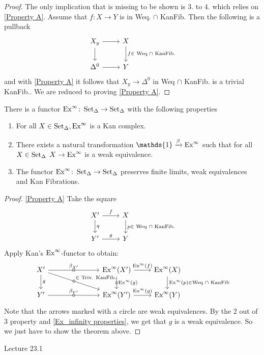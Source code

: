 \begin{proof}
    The only implication that is missing to be shown is 3. to 4. which relies on \cref{Property A}.
    Assume that $f\colon X \to Y$ is in Weq. $\cap$ KanFib.
    Then the following is a pullback
    \[
    \begin{tikzcd}
        X_y
        \rar
        \dar
        &
        X
        \ar[d, "f \in \text{ Weq $\cap$ KanFib.}"]
        \\
        \Delta^0 
        \rar
        &
        Y
    \end{tikzcd}
    \]
    and with \cref{Property A} it follows that $X_y \to \Delta^0$ in Weq $\cap$ KanFib. is a trivial KanFib..
    We are reduced to proving \cref{Property A}.
\end{proof}

\begin{thm}
    There is a functor $\text{Ex}^\infty \colon \operatorname{Set}_{\Delta} \to \operatorname{Set}_{\Delta}$ with the following properties 
    \begin{enumerate}
        \item 
        For all $X \in \operatorname{Set}_{\Delta}, \text{Ex}^\infty$ is a Kan complex.
        \item 
        There exists a natural transformation $\mathds{1} \xrightarrow{\beta} \Exinfty$ such that for all $X \in \operatorname{Set}_{\Delta}$ $X \to \text{Ex}^\infty$ is a weak equivalence.
        \item   
        The functor $\text{Ex}^\infty \colon \operatorname{Set}_{\Delta} \to \operatorname{Set}_{\Delta}$ preserves finite limits, weak equivalences and Kan Fibrations.
    \end{enumerate}
\end{thm}

\begin{proof}{\cref{Property A}}    
    Take the square 
    \[
    \begin{tikzcd}
        X' 
        \ar[r,"f"]
        \ar[d, "q"]
        &
        X
        \ar[d, "p \in \text{ Weq $\cap$ KanFib.}"]
        \\
        Y'
        \ar[r, "g"]
        &
        Y
    \end{tikzcd}
    \]
    Apply Kan's $\text{Ex}^\infty$-functor to obtain:
    \[
    \begin{tikzcd}
        X'
        \ar[d, "g"]
        \ar[rrr, "\circ" marking, "\beta_{X'}"]
        \ar[rrrd, "\circ" marking, "\in \text{ Triv. KanFib. }"]
        &&&
        \Exinfty(X')
        \ar[r,"\Exinfty(f)"]
        \ar[d, "\circ" marking, "\Exinfty(g)"]
        &
        \Exinfty(X) 
        \ar[d, "\Exinfty(p) \in \text{Weq $\cap$ KanFib}"]
        \\
        Y'
        \ar[rrr, "\circ" marking, "\beta_{Y'}"]
        &&&
        \Exinfty(Y')
        \ar[r, "\Exinfty(g)"]
        &
        \Exinfty(Y)
    \end{tikzcd}
    \]
    Note that the arrows marked with a circle are weak equivalences.
    By the 2 out of 3 property and \cref{Ex_infinity properties}, we get that $g$ is a weak equivalence.
    So we just have to show the theorem above.
\end{proof}   

Lecture 23.1

